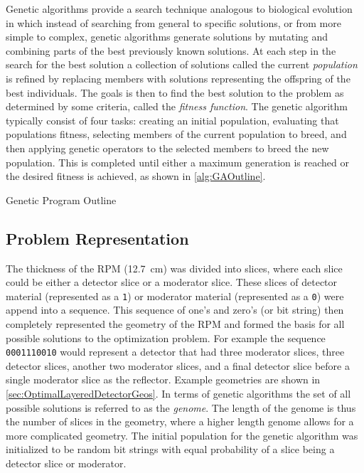 Genetic algorithms provide a search technique analogous to biological evolution in which instead of searching from general to specific solutions, or from more simple to complex, genetic algorithms generate solutions by mutating and combining parts of the best previously known solutions.
At each step in the search for the best solution a collection of solutions called the current \textit{population} is refined by replacing members with solutions representing the offspring of the best individuals.
The goals is then to find the best solution to the problem as determined by some criteria, called the \textit{fitness function}.
The genetic algorithm typically consist of four tasks: creating an initial population, evaluating that populations fitness, selecting members of the current population to breed, and then applying genetic operators to the selected members to breed the new population. 
This is completed until either a maximum generation is reached or the desired fitness is achieved, as shown in \autoref{alg:GAOutline}.
\begin{algorithm}
  \caption{Genetic Program Outline}
  \label{alg:GAOutline}
  \begin{algorithmic}
      \ENDFOR
      \ENDFOR
    \ENDWHILE
  \end{algorithmic}
\end{algorithm}

\subsection{Problem Representation}
The thickness of the RPM  (\SI{12.7}{\cm}) was divided into slices, where each slice could be either a detector slice or a moderator slice.
These slices of detector material (represented as a \verb+1+) or moderator material (represented as a \verb+0+) were append into a sequence.
This sequence of one's and zero's (or bit string) then completely represented the geometry of the RPM and formed the basis for all possible solutions to the optimization problem.
For example the sequence \verb+0001110010+ would represent a detector that had three moderator slices, three detector slices, another two moderator slices, and a final detector slice before a single moderator slice as the reflector.
Example geometries are shown in \autoref{sec:OptimalLayeredDetectorGeos}.
In terms of genetic algorithms the set of all possible solutions is referred to as the \textit{genome}.
The length of the genome is thus the number of slices in the geometry, where a higher length genome allows for a more complicated geometry.
The initial population for the genetic algorithm was initialized to be random bit strings with equal probability of a slice being a detector slice or moderator.

